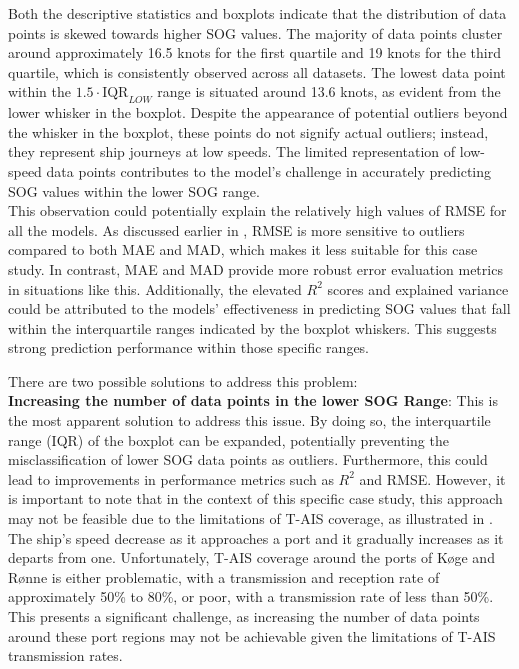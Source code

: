 
Both the descriptive statistics and boxplots indicate that the distribution of data points is skewed towards higher SOG values. The majority of data points cluster around approximately 16.5 knots for the first quartile and 19 knots for the third quartile, which is consistently observed across all datasets. The lowest data point within the $1.5 \cdot \text{IQR}_{LOW}$ range is situated around 13.6 knots, as evident from the lower whisker in the boxplot. Despite the appearance of potential outliers beyond the whisker in the boxplot, these points do not signify actual outliers; instead, they represent ship journeys at low speeds. The limited representation of low-speed data points contributes to the model's challenge in accurately predicting SOG values within the lower SOG range.\\

This observation could potentially explain the relatively high values of RMSE for all the models. As discussed earlier in , RMSE is more sensitive to outliers compared to both MAE and MAD, which makes it less suitable for this case study. In contrast, MAE and MAD provide more robust error evaluation metrics in situations like this. Additionally, the elevated $R^2$ scores and explained variance could be attributed to the models' effectiveness in predicting SOG values that fall within the interquartile ranges indicated by the boxplot whiskers. This suggests strong prediction performance within those specific ranges.\\

\pagebreak

There are two possible solutions to address this problem:\\ 

\textbf{Increasing the number of data points in the lower SOG Range}: This is the most apparent solution to address this issue. By doing so, the interquartile range (IQR) of the boxplot can be expanded, potentially preventing the misclassification of lower SOG data points as outliers. Furthermore, this could lead to improvements in performance metrics such as $R^2$ and RMSE. However, it is important to note that in the context of this specific case study, this approach may not be feasible due to the limitations of T-AIS coverage, as illustrated in . The ship's speed decrease as it approaches a port and it gradually increases as it departs from one. Unfortunately, T-AIS coverage around the ports of K{\o}ge and R{\o}nne is either problematic, with a transmission and reception rate of approximately 50\% to 80\%, or poor, with a transmission rate of less than 50\%. This presents a significant challenge, as increasing the number of data points around these port regions may not be achievable given the limitations of T-AIS transmission rates.\\


